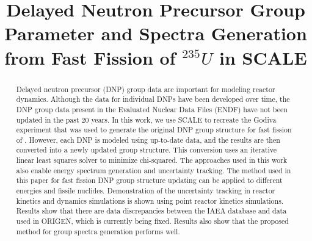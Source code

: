 \documentclass{style/nseJournal}
\begin{document}
\title{Delayed Neutron Precursor Group Parameter and Spectra Generation from Fast Fission of $^{235}U$ in SCALE}

{}
{}

{}


\titlePage

\begin{abstract}
Delayed neutron precursor (DNP) group data are important for modeling reactor dynamics. Although the data for individual DNPs have been developed over time, the DNP group data present in the Evaluated Nuclear Data Files (ENDF) have not been updated in the past 20 years. In this work, we use SCALE to recreate the Godiva experiment that was used to generate the original DNP group structure for fast fission of . However, each DNP is modeled using up-to-date data, and the results are then converted into a newly updated group structure. This conversion uses an iterative linear least squares solver to minimize chi-squared. The approaches used in this work also enable energy spectrum generation and uncertainty tracking. The method used in this paper for fast  fission DNP group structure updating can be applied to different energies and fissile nuclides. Demonstration of the uncertainty tracking in reactor kinetics and dynamics simulations is shown using point reactor kinetics simulations. Results show that there are data discrepancies between the IAEA database and data used in ORIGEN, which is currently being fixed. Results also show that the proposed method for group spectra generation performs well.
\end{abstract}
\end{document}
